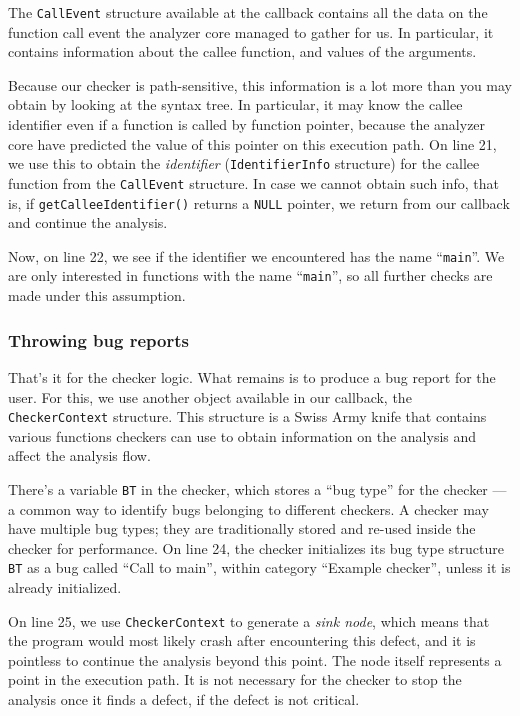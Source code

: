\documentclass[a4paper,12pt]{article}
\begin{document}
The \lstinline|CallEvent| structure available at the callback contains all the data on the function call event the analyzer core managed to gather for us. In particular, it contains information about the callee function, and values of the arguments.

Because our checker is path-sensitive, this information is a lot more than you may obtain by looking at the syntax tree. In particular, it may know the callee identifier even if a function is called by function pointer, because the analyzer core have predicted the value of this pointer on this execution path. On line 21, we use this to obtain the \emph{identifier} (\lstinline|IdentifierInfo| structure) for the callee function from the \lstinline|CallEvent| structure. In case we cannot obtain such info, that is, if \lstinline|getCalleeIdentifier()| returns a \lstinline|NULL| pointer, we return from our callback and continue the analysis.

Now, on line 22, we see if the identifier we encountered has the name ``\lstinline|main|''. We are only interested in functions with the name ``\lstinline|main|'', so all further checks are made under this assumption.

\subsubsection{Throwing bug reports}

That's it for the checker logic. What remains is to produce a bug report for the user. For this, we use another object available in our callback, the \lstinline|CheckerContext| structure. This structure is a Swiss Army knife that contains various functions checkers can use to obtain information on the analysis and affect the analysis flow.

There's a variable \lstinline|BT| in the checker, which stores a ``bug type'' for the checker --- a common way to identify bugs belonging to different checkers. A checker may have multiple bug types; they are traditionally stored and re-used inside the checker for performance. On line 24, the checker initializes its bug type structure \lstinline|BT| as a bug called ``Call to main'', within category ``Example checker'', unless it is already initialized.

On line 25, we use \lstinline|CheckerContext| to generate a \emph{sink node}, which means that the program would most likely crash after encountering this defect, and it is pointless to continue the analysis beyond this point. The node itself represents a point in the execution path. It is not necessary for the checker to stop the analysis once it finds a defect, if the defect is not critical.
\end{document}
